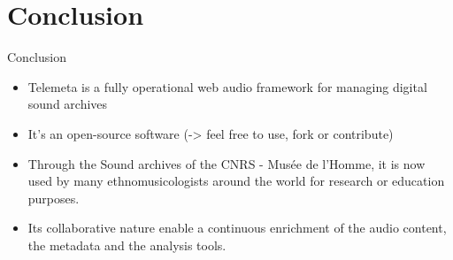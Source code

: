 \documentclass[final, hyperref, table]{beamer}
\begin{document}
\section{Conclusion}



\begin{frame}{Conclusion}
  \begin{block}{}
    \begin{itemize}[<+->]
    \item Telemeta is a \alert{fully operational} web audio framework
      for managing digital sound archives
    \item It's an \alert{open-source} software (-> feel free to use,
      fork or contribute)
    \item Through the Sound archives of the CNRS - Musée de l’Homme,
      it is now used by many ethnomusicologists around the world for
      research or education purposes.
    \item Its collaborative nature enable a \alert{continuous
        enrichment} of the audio content, the metadata and the
      analysis tools.
    \end{itemize}
  \end{block}
\end{frame}
\end{document}
